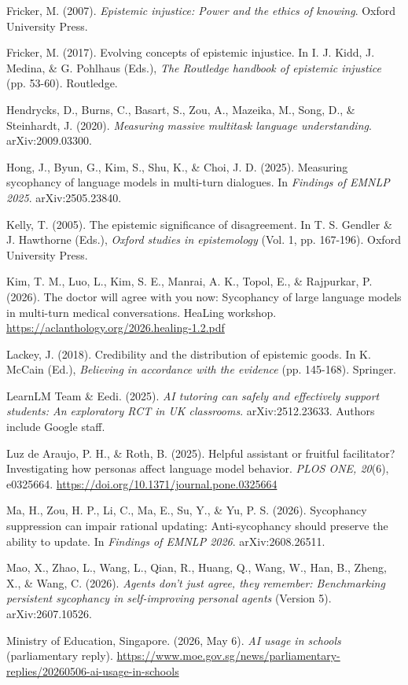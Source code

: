 Fricker, M. (2007). \emph{Epistemic injustice: Power and the ethics of knowing}. Oxford University Press.

Fricker, M. (2017). Evolving concepts of epistemic injustice. In I. J. Kidd, J. Medina, \& G. Pohlhaus (Eds.), \emph{The Routledge handbook of epistemic injustice} (pp. 53-60). Routledge.

Hendrycks, D., Burns, C., Basart, S., Zou, A., Mazeika, M., Song, D., \& Steinhardt, J. (2020). \emph{Measuring massive multitask language understanding}. arXiv:2009.03300.

Hong, J., Byun, G., Kim, S., Shu, K., \& Choi, J. D. (2025). Measuring sycophancy of language models in multi-turn dialogues. In \emph{Findings of EMNLP 2025}. arXiv:2505.23840.

Kelly, T. (2005). The epistemic significance of disagreement. In T. S. Gendler \& J. Hawthorne (Eds.), \emph{Oxford studies in epistemology} (Vol. 1, pp. 167-196). Oxford University Press.

Kim, T. M., Luo, L., Kim, S. E., Manrai, A. K., Topol, E., \& Rajpurkar, P. (2026). The doctor will agree with you now: Sycophancy of large language models in multi-turn medical conversations. HeaLing workshop. \url{https://aclanthology.org/2026.healing-1.2.pdf}

Lackey, J. (2018). Credibility and the distribution of epistemic goods. In K. McCain (Ed.), \emph{Believing in accordance with the evidence} (pp. 145-168). Springer.

LearnLM Team \& Eedi. (2025). \emph{AI tutoring can safely and effectively support students: An exploratory RCT in UK classrooms}. arXiv:2512.23633. Authors include Google staff.

Luz de Araujo, P. H., \& Roth, B. (2025). Helpful assistant or fruitful facilitator? Investigating how personas affect language model behavior. \emph{PLOS ONE, 20}(6), e0325664. \url{https://doi.org/10.1371/journal.pone.0325664}

Ma, H., Zou, H. P., Li, C., Ma, E., Su, Y., \& Yu, P. S. (2026). Sycophancy suppression can impair rational updating: Anti-sycophancy should preserve the ability to update. In \emph{Findings of EMNLP 2026}. arXiv:2608.26511.

Mao, X., Zhao, L., Wang, L., Qian, R., Huang, Q., Wang, W., Han, B., Zheng, X., \& Wang, C. (2026). \emph{Agents don't just agree, they remember: Benchmarking persistent sycophancy in self-improving personal agents} (Version 5). arXiv:2607.10526.

Ministry of Education, Singapore. (2026, May 6). \emph{AI usage in schools} (parliamentary reply). \url{https://www.moe.gov.sg/news/parliamentary-replies/20260506-ai-usage-in-schools}

